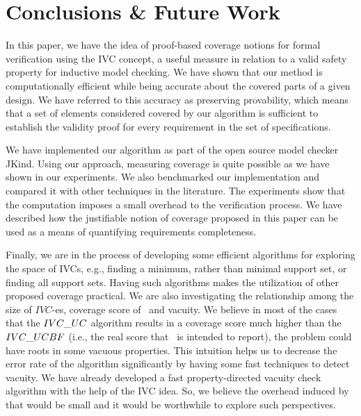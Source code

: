 \section{Conclusions \& Future Work}
\label{sec:conclusion}

In this paper, we have the idea of proof-based coverage notions for formal verification using
the IVC concept, a useful measure in relation to
a valid safety property for inductive model checking. We have shown that our method
 is computationally efficient while
 being accurate about the covered parts of a given design.
 We have referred to this accuracy as preserving provability, which means
 that a set of elements considered covered by our algorithm is sufficient
 to establish the validity proof for every requirement in the set of specifications.

 We have implemented
our algorithm as part of the open source model checker JKind. Using our approach, measuring coverage is quite possible as we have shown in our experiments.
 We also benchmarked our implementation and compared it with other techniques in the literature.
 The experiments show that the computation imposes a small overhead to the verification process. We have described how the justifiable notion of coverage proposed in this paper can be used as a
means of quantifying requirements completeness.

Finally, we are in the process of developing some efficient algorithms for exploring the space of IVCs, e.g., finding a minimum, rather than minimal support set, or finding all support sets. Having such algorithms makes the utilization of other proposed coverage practical. We are also investigating the relationship among the size of $IVC$-es, coverage score of \ivccov\, and vacuity. We believe in most of the cases that the ${IVC\_UC}$ algorithm results in a coverage score much higher
than the ${IVC\_UCBF}$ (i.e., the real score that \ivccov\ is intended to report), the problem
could have roots in some vacuous properties. This intuition helps us to decrease the error rate of the \ucalg algorithm significantly by having some fast techniques to detect vacuity. We have already developed a  fast property-directed vacuity check
algorithm with the help of the IVC idea. So, we believe the overhead induced by that would be small and it would be worthwhile to explore such perspectives. 